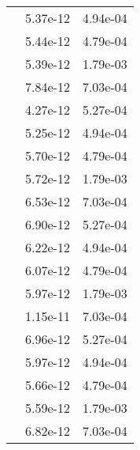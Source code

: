 \begin{table}
\begin{tabular}{c|cc|}
\multicolumn{1}{|c|}{} & \multicolumn{1}{|c|}{  5.37e-12} & \multicolumn{1}{|c|}{  4.94e-04} \\ 
\multicolumn{1}{|c|}{} & \multicolumn{1}{|c|}{  5.44e-12} & \multicolumn{1}{|c|}{  4.79e-04} \\ 
\multicolumn{1}{|c|}{} & \multicolumn{1}{|c|}{  5.39e-12} & \multicolumn{1}{|c|}{  1.79e-03} \\ 
\multicolumn{1}{|c|}{} & \multicolumn{1}{|c|}{  7.84e-12} & \multicolumn{1}{|c|}{  7.03e-04} \\ 
\multicolumn{1}{|c|}{} & \multicolumn{1}{|c|}{  4.27e-12} & \multicolumn{1}{|c|}{  5.27e-04} \\ 
\multicolumn{1}{|c|}{} & \multicolumn{1}{|c|}{  5.25e-12} & \multicolumn{1}{|c|}{  4.94e-04} \\ 
\multicolumn{1}{|c|}{} & \multicolumn{1}{|c|}{  5.70e-12} & \multicolumn{1}{|c|}{  4.79e-04} \\ 
\multicolumn{1}{|c|}{} & \multicolumn{1}{|c|}{  5.72e-12} & \multicolumn{1}{|c|}{  1.79e-03} \\ 
\multicolumn{1}{|c|}{} & \multicolumn{1}{|c|}{  6.53e-12} & \multicolumn{1}{|c|}{  7.03e-04} \\ 
\multicolumn{1}{|c|}{} & \multicolumn{1}{|c|}{  6.90e-12} & \multicolumn{1}{|c|}{  5.27e-04} \\ 
\multicolumn{1}{|c|}{} & \multicolumn{1}{|c|}{  6.22e-12} & \multicolumn{1}{|c|}{  4.94e-04} \\ 
\multicolumn{1}{|c|}{} & \multicolumn{1}{|c|}{  6.07e-12} & \multicolumn{1}{|c|}{  4.79e-04} \\ 
\multicolumn{1}{|c|}{} & \multicolumn{1}{|c|}{  5.97e-12} & \multicolumn{1}{|c|}{  1.79e-03} \\ 
\multicolumn{1}{|c|}{} & \multicolumn{1}{|c|}{  1.15e-11} & \multicolumn{1}{|c|}{  7.03e-04} \\ 
\multicolumn{1}{|c|}{} & \multicolumn{1}{|c|}{  6.96e-12} & \multicolumn{1}{|c|}{  5.27e-04} \\ 
\multicolumn{1}{|c|}{} & \multicolumn{1}{|c|}{  5.97e-12} & \multicolumn{1}{|c|}{  4.94e-04} \\ 
\multicolumn{1}{|c|}{} & \multicolumn{1}{|c|}{  5.66e-12} & \multicolumn{1}{|c|}{  4.79e-04} \\ 
\multicolumn{1}{|c|}{} & \multicolumn{1}{|c|}{  5.59e-12} & \multicolumn{1}{|c|}{  1.79e-03} \\ 
\multicolumn{1}{|c|}{} & \multicolumn{1}{|c|}{  6.82e-12} & \multicolumn{1}{|c|}{  7.03e-04} \\ 

\end{tabular}
\end{table}
